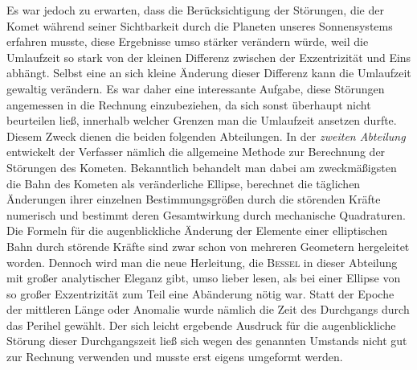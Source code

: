 Es war jedoch zu erwarten, dass die Berücksichtigung der Störungen, die der Komet während seiner Sichtbarkeit durch die Planeten unseres Sonnensystems erfahren musste, diese Ergebnisse umso stärker verändern würde, weil die Umlaufzeit so stark von der kleinen Differenz zwischen der Exzentrizität und Eins abhängt. Selbst eine an sich kleine Änderung dieser Differenz kann die Umlaufzeit gewaltig verändern. Es war daher eine interessante Aufgabe, diese Störungen angemessen in die Rechnung einzubeziehen, da sich sonst überhaupt nicht beurteilen ließ, innerhalb welcher Grenzen man die Umlaufzeit ansetzen durfte. Diesem Zweck dienen die beiden folgenden Abteilungen. In der \emph{zweiten Abteilung} entwickelt der Verfasser nämlich die allgemeine Methode zur Berechnung der Störungen des Kometen. Bekanntlich behandelt man dabei am zweckmäßigsten die Bahn des Kometen als veränderliche Ellipse, berechnet die täglichen Änderungen ihrer einzelnen Bestimmungsgrößen durch die störenden Kräfte numerisch und bestimmt deren Gesamtwirkung durch mechanische Quadraturen. Die Formeln für die augenblickliche Änderung der Elemente einer elliptischen Bahn durch störende Kräfte sind zwar schon von mehreren Geometern hergeleitet worden. Dennoch wird man die neue Herleitung, die \textsc{Bessel} in dieser Abteilung mit großer analytischer Eleganz gibt, umso lieber lesen, als bei einer Ellipse von so großer Exzentrizität zum Teil eine Abänderung nötig war. Statt der Epoche der mittleren Länge oder Anomalie wurde nämlich die Zeit des Durchgangs durch das Perihel gewählt. Der sich leicht ergebende Ausdruck für die augenblickliche Störung dieser Durchgangszeit ließ sich wegen des genannten Umstands nicht gut zur Rechnung verwenden und musste erst eigens umgeformt werden.

